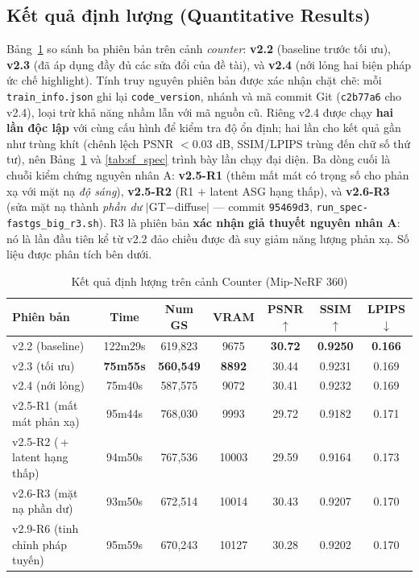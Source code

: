     \subsection{Kết quả định lượng (Quantitative Results)}
    Bảng~\ref{tab:sf_quant} so sánh ba phiên bản trên cảnh \textit{counter}:
    \textbf{v2.2} (baseline trước tối ưu), \textbf{v2.3} (đã áp dụng đầy đủ các sửa
    đổi của đề tài), và \textbf{v2.4} (nới lỏng hai biện pháp ức chế highlight). Tính
    truy nguyên phiên bản được xác nhận chặt chẽ: mỗi \texttt{train\_info.json} ghi
    lại \texttt{code\_version}, nhánh và mã commit Git (\texttt{c2b77a6} cho v2.4),
    loại trừ khả năng nhầm lẫn với mã nguồn cũ. Riêng v2.4 được chạy \textbf{hai lần
    độc lập} với cùng cấu hình để kiểm tra độ ổn định; hai lần cho kết quả gần như
    trùng khít (chênh lệch PSNR $<0.03$ dB, SSIM/LPIPS trùng đến chữ số thứ tư), nên
    Bảng~\ref{tab:sf_quant} và \ref{tab:sf_spec} trình bày lần chạy đại diện. Ba dòng
    cuối là chuỗi kiểm chứng nguyên nhân A: \textbf{v2.5-R1} (thêm mất mát có trọng số
    cho phản xạ với mặt nạ \textit{độ sáng}), \textbf{v2.5-R2} (R1 $+$ latent ASG hạng
    thấp), và \textbf{v2.6-R3} (sửa mặt nạ thành \textit{phần dư} $|$GT$-$diffuse$|$ ---
    commit \texttt{95469d3}, \texttt{run\_spec-fastgs\_big\_r3.sh}). R3 là phiên bản
    \textbf{xác nhận giả thuyết nguyên nhân A}: nó là lần đầu tiên kể từ v2.2 đảo chiều
    được đà suy giảm năng lượng phản xạ. Số liệu được phân tích bên dưới.

    \begin{table}[h]
    \centering
    \caption{Kết quả định lượng trên cảnh Counter (Mip-NeRF 360)}
    \label{tab:sf_quant}
    \vspace{0.2cm}
    \begin{tabular}{@{}lcccccc@{}}
    \toprule
    \textbf{Phiên bản} & \textbf{Time} & \textbf{Num GS} & \textbf{VRAM} &
    \textbf{PSNR}$\uparrow$ & \textbf{SSIM}$\uparrow$ & \textbf{LPIPS}$\downarrow$ \\ \midrule
    v2.2 (baseline)   & 122m29s & 619{,}823 & 9675 & \textbf{30.72} & \textbf{0.9250} & \textbf{0.166} \\
    v2.3 (tối ưu)     & \textbf{75m55s} & \textbf{560{,}549} & \textbf{8892} & 30.44 & 0.9231 & 0.169 \\
    v2.4 (nới lỏng)   & 75m40s & 587{,}575 & 9072 & 30.41 & 0.9232 & 0.169 \\
    v2.5-R1 (mất mát phản xạ) & 95m44s & 768{,}030 & 9993 & 29.72 & 0.9182 & 0.171 \\
    v2.5-R2 (\,+\,latent hạng thấp) & 94m50s & 767{,}536 & 10003 & 29.59 & 0.9164 & 0.173 \\
    v2.6-R3 (mặt nạ phần dư) & 93m50s & 672{,}514 & 10014 & 30.43 & 0.9207 & 0.170 \\
    v2.9-R6 (tinh chỉnh pháp tuyến) & 95m59s & 670{,}243 & 10127 & 30.28 & 0.9202 & 0.170 \\
    \bottomrule
    \end{tabular}
    \end{table}

